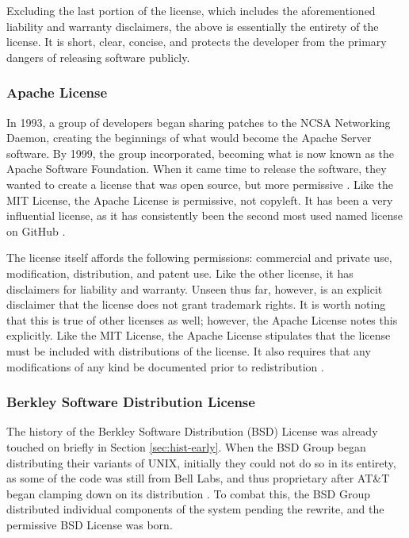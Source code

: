 \documentclass[manuscript,screen,nonacm,12pt]{acmart}
\begin{document}
Excluding the last portion of the license, which includes the aforementioned
liability and warranty disclaimers, the above is essentially the entirety of the
license. It is short, clear, concise, and protects the developer from the
primary dangers of releasing software publicly.

\subsubsection{Apache License}
In 1993, a group of developers began sharing patches to the NCSA Networking
Daemon, creating the beginnings of what would become the Apache Server software.
By 1999, the group incorporated, becoming what is now known as the Apache
Software Foundation. When it came time to release the software, they wanted to
create a license that was open source, but more permissive \cite{apacheHistory}.
Like the MIT License, the Apache License is permissive, not copyleft. It has
been a very influential license, as it has consistently been the second most
used named license on GitHub \cite{githubUsage}.

The license itself affords the following permissions: commercial and private
use, modification, distribution, and patent use. Like the other license, it has
disclaimers for liability and warranty. Unseen thus far, however, is an explicit
disclaimer that the license does not grant trademark rights. It is worth noting
that this is true of other licenses as well; however, the Apache License notes
this explicitly. Like the MIT License, the Apache License stipulates that the
license must be included with distributions of the license. It also requires
that any modifications of any kind be documented prior to redistribution
\cite{ApacheLicense}.

\subsubsection{Berkley Software Distribution License}
The history of the Berkley Software Distribution (BSD) License was already
touched on briefly in Section \ref{sec:hist-early}. When the BSD Group began
distributing their variants of UNIX, initially they could not do so in its
entirety, as some of the code was still from Bell Labs, and thus proprietary
after AT\&T began clamping down on its distribution \cite{Fortunato2021}. To
combat this, the BSD Group distributed individual components of the system
pending the rewrite, and the permissive BSD License was born.
\end{document}
